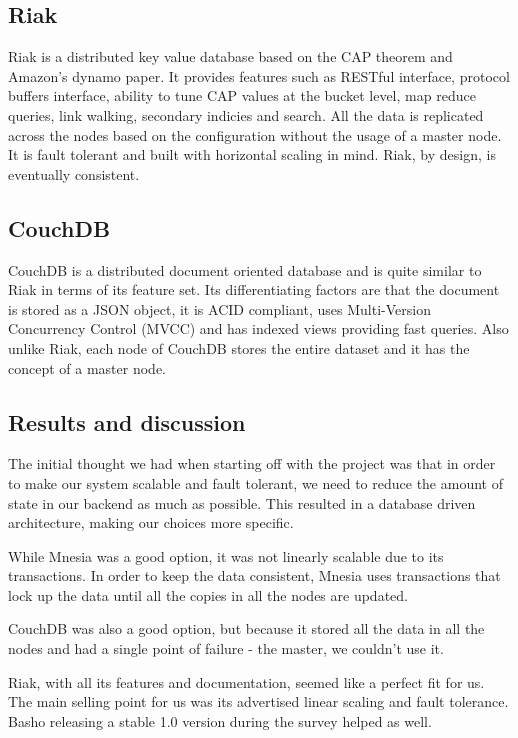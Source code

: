 \documentclass[11pt,a4paper]{report}
\begin{document}
\subsection{Riak}
Riak is a distributed key value database based on the CAP
theorem\cite{cap_theorem} and Amazon's dynamo paper\cite{dynamo}. It provides
features such as RESTful interface, protocol buffers interface, ability to tune
CAP values at the bucket level, map reduce queries, link walking, secondary
indicies and search. All the data is replicated across the nodes based on the
configuration without the usage of a master node. It is fault tolerant and built
with horizontal scaling in mind. Riak, by design, is eventually consistent.

\subsection{CouchDB}
CouchDB is a distributed document oriented database and is quite similar to Riak
in terms of its feature set. Its differentiating factors are that the document
is stored as a JSON object, it is ACID compliant, uses Multi-Version Concurrency
Control (MVCC) and has indexed views providing fast queries. Also unlike Riak,
each node of CouchDB stores the entire dataset and it has the concept of a
master node.

\subsection{Results and discussion}
The initial thought we had when starting off with the project was that in order
to make our system scalable and fault tolerant, we need to reduce the amount of
state in our backend as much as possible. This resulted in a database driven
architecture, making our choices more specific.

While Mnesia was a good option, it was not linearly scalable due to its
transactions. In order to keep the data consistent, Mnesia uses transactions
that lock up the data until all the copies in all the nodes are updated.

CouchDB was also a good option, but because it stored all the data in all the
nodes and had a single point of failure - the master, we couldn't use it.

Riak, with all its features and documentation, seemed like a perfect fit for
us. The main selling point for us was its advertised linear scaling and fault
tolerance. Basho releasing a stable 1.0 version during the survey helped as
well.

\renewcommand\bibname{References}


\end{document}
